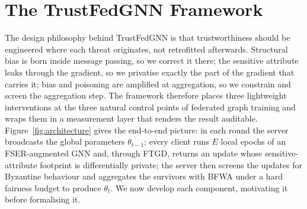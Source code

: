 \section{The TrustFedGNN Framework}
\label{sec:method}

The design philosophy behind TrustFedGNN is that trustworthiness should be
engineered where each threat originates, not retrofitted afterwards. Structural
bias is born inside message passing, so we correct it there; the sensitive
attribute leaks through the gradient, so we privatise exactly the part of the
gradient that carries it; bias and poisoning are amplified at aggregation, so we
constrain and screen the aggregation step. The framework therefore places three
lightweight interventions at the three natural control points of federated graph
training and wraps them in a measurement layer that renders the result
auditable. Figure~\ref{fig:architecture} gives the end-to-end picture: in each
round the server broadcasts the global parameters $\theta_{t-1}$; every client
runs $E$ local epochs of an FSER-augmented GNN and, through FTGD, returns an
update whose sensitive-attribute footprint is differentially private; the server
then screens the updates for Byzantine behaviour and aggregates the survivors
with BFWA under a hard fairness budget to produce $\theta_t$. We now develop each
component, motivating it before formalising it.

